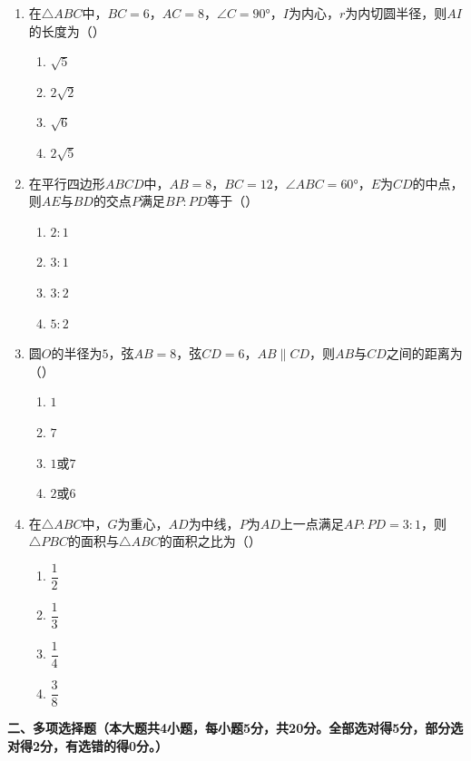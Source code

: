 \documentclass[12pt, a4paper]{ctexart}
\begin{document}
\begin{enumerate}[label=\Alph*.]
\item 在$\triangle ABC$中，$BC=6$，$AC=8$，$\angle C=90°$，$I$为内心，$r$为内切圆半径，则$AI$的长度为（\quad）
\begin{enumerate}[label=]
\item $\sqrt{5}$ \qquad \item $2\sqrt{2}$ \qquad \item $\sqrt{6}$ \qquad \item $2\sqrt{5}$
\end{enumerate}

\item 在平行四边形$ABCD$中，$AB=8$，$BC=12$，$\angle ABC=60°$，$E$为$CD$的中点，则$AE$与$BD$的交点$P$满足$BP:PD$等于（\quad）
\begin{enumerate}[label=]
\item $2:1$ \qquad \item $3:1$ \qquad \item $3:2$ \qquad \item $5:2$
\end{enumerate}

\item 圆$O$的半径为$5$，弦$AB=8$，弦$CD=6$，$AB \parallel CD$，则$AB$与$CD$之间的距离为（\quad）
\begin{enumerate}[label=]
\item $1$ \qquad \item $7$ \qquad \item $1$或$7$ \qquad \item $2$或$6$
\end{enumerate}

\item 在$\triangle ABC$中，$G$为重心，$AD$为中线，$P$为$AD$上一点满足$AP:PD=3:1$，则$\triangle PBC$的面积与$\triangle ABC$的面积之比为（\quad）
\begin{enumerate}[label=]
\item $\dfrac{1}{2}$ \qquad \item $\dfrac{1}{3}$ \qquad \item $\dfrac{1}{4}$ \qquad \item $\dfrac{3}{8}$
\end{enumerate}

\end{enumerate}

\vspace{0.5em}

\noindent\textbf{二、多项选择题（本大题共4小题，每小题5分，共20分。全部选对得5分，部分选对得2分，有选错的得0分。）}
\end{document}
